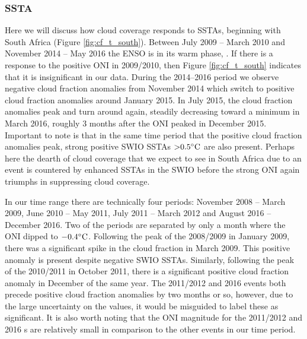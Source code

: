

\subsubsection{SSTA}
\label{sec:disc:ssta}
Here we will discuss how cloud coverage responds to SSTAs, beginning
with South Africa (Figure \ref{fig:cf_t_south}). Between July 2009 --
March 2010 and November 2014 -- May 2016 the ENSO is in its warm phase,
\elnino{}. If there is a response to the positive ONI in 2009/2010,
then Figure \ref{fig:cf_t_south} indicates that it is insignificant in
our data. During the 2014--2016 \elnino{} period we observe negative
cloud fraction anomalies from November 2014 which switch to positive
cloud fraction anomalies around January 2015. In July 2015, the cloud
fraction anomalies peak and turn around again, steadily decreasing
toward a minimum in March 2016, roughly 3 months after the ONI peaked
in December 2015. Important to note is that in the same time period
that the positive cloud fraction anomalies peak, strong positive SWIO
SSTAs ${>}0.5^{\circ}\mathrm{C}$ are also present. Perhaps here the dearth of cloud
coverage that we expect to see in South Africa due to an \elnino{}
event is countered by enhanced SSTAs in the SWIO before the strong ONI
again triumphs in suppressing cloud coverage.

In our time range there are technically four \nina{} periods: November
2008 -- March 2009, June 2010 -- May 2011, July 2011 -- March 2012 and
August 2016 -- December 2016. Two of the periods are separated by only
a month where the ONI dipped to $-0.4^{\circ}\mathrm{C}$. Following the peak of the
2008/2009 \nina{} in January 2009, there was a significant spike in
the cloud fraction in March 2009.  This positive anomaly is present
despite negative SWIO SSTAs. Similarly, following the peak of the
2010/2011 \nina{} in October 2011, there is a significant positive
cloud fraction anomaly in December of the same year. The 2011/2012 and
2016 \nina{} events both precede positive cloud fraction anomalies by
two months or so, however, due to the large uncertainty on the values,
it would be misguided to label these as significant. It is also worth
noting that the ONI magnitude for the 2011/2012 and 2016 \nina s are
relatively small in comparison to the other events in our time period.

